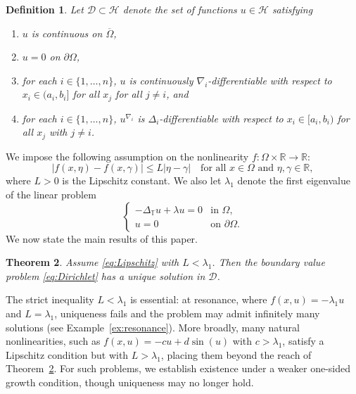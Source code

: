 \documentclass{article}
\newtheorem{theorem}{Theorem}[section]
\newtheorem{definition}[theorem]{Definition}
\numberwithin{equation}{section}
\numberwithin{theorem}{section}
\begin{document}
\begin{definition}\label{def:D}
Let $\mathscr{D} \subset \mathscr{H}$ denote the set of functions $u \in \mathscr{H}$ satisfying
\begin{enumerate}
\item[(i)] $u$ is continuous on $\overline{\Omega}$,
\item[(ii)] $u = 0$ on $\partial\Omega$,
\item[(iii)] for each $i \in \{1, \ldots, n\}$, $u$ is continuously $\nabla_i$-differentiable with respect to $x_i \in (a_i, b_i]$ for all $x_j$ for all $j \neq i$, and
\item[(iv)] for each $i \in \{1, \ldots, n\}$, $u^{\nabla_i}$ is $\Delta_i$-differentiable with respect to $x_i \in [a_i, b_i)$ for all $x_j$ with $j \neq i$.
\end{enumerate}
\end{definition}
We impose the following assumption on the nonlinearity $f \colon \Omega \times \mathbb{R} \to \mathbb{R}$:
\begin{equation}\label{eq:Lipschitz}
|f(x, \eta) - f(x, \gamma)| \leq L|\eta - \gamma| \quad \text{for all } x \in \Omega \text{ and } \eta, \gamma \in \mathbb{R},
\end{equation}
where $L > 0$ is the Lipschitz constant. We also let $\lambda_1$ denote the first eigenvalue of the linear problem
\begin{equation}\label{eq:linear-evp}
\begin{cases}
-\Delta_{\mathbb{T}} u + \lambda u = 0 & \text{in } \Omega,\\
u = 0 & \text{on } \partial\Omega.
\end{cases}
\end{equation}
We now state the main results of this paper.
\begin{theorem}\label{thm:main}
Assume \eqref{eq:Lipschitz} with $L < \lambda_1$. Then the boundary
value problem \eqref{eq:Dirichlet} has a unique solution in $\mathscr{D}$.
\end{theorem}

The strict inequality $L < \lambda_1$ is essential: at resonance, where
$f(x,u) = -\lambda_1 u$ and $L = \lambda_1$, uniqueness fails and the
problem may admit infinitely many solutions (see
Example~\ref{ex:resonance}). More broadly, many natural nonlinearities,
such as $f(x,u) = -cu + d\sin(u)$ with $c > \lambda_1$, satisfy
a Lipschitz condition but with $L > \lambda_1$, placing them beyond the reach of Theorem~\ref{thm:main}. For such problems, we establish existence under a weaker one-sided growth condition, though uniqueness may no longer hold.
\end{document}
